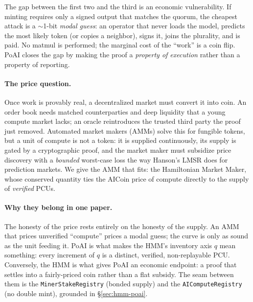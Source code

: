 \documentclass[11pt]{article}
\newcommand{\code}[1]{\texttt{#1}}
\begin{document}
The gap between the first two and the third is an economic vulnerability. If
minting requires only a signed output that matches the quorum, the cheapest attack
is a $\sim$1-bit \emph{modal guess}: an operator that never loads the model,
predicts the most likely token (or copies a neighbor), signs it, joins the
plurality, and is paid. No matmul is performed; the marginal cost of the ``work''
is a coin flip. PoAI closes the gap by making the proof a \emph{property of
execution} rather than a property of reporting.

\paragraph{The price question.} Once work is provably real, a decentralized market
must convert it into coin. An order book needs matched counterparties and deep
liquidity that a young compute market lacks; an oracle reintroduces the trusted
third party the proof just removed. Automated market makers (AMMs) solve this for
fungible tokens, but a unit of compute is not a token: it is supplied
continuously, its supply is gated by a cryptographic proof, and the market maker
must subsidize price discovery with a \emph{bounded} worst-case loss the way Hanson's
LMSR does for prediction markets. We give the AMM that fits: the Hamiltonian
Market Maker, whose conserved quantity ties the AICoin price of compute directly to
the supply of \emph{verified} PCUs.

\paragraph{Why they belong in one paper.} The honesty of the price rests entirely
on the honesty of the supply. An AMM that prices unverified ``compute'' prices a
modal guess; the curve is only as sound as the unit feeding it. PoAI is what makes
the HMM's inventory axis $q$ mean something: every increment of $q$ is a distinct,
verified, non-replayable PCU. Conversely, the HMM is what gives PoAI an economic
endpoint: a proof that settles into a fairly-priced coin rather than a flat
subsidy. The seam between them is the \code{MinerStakeRegistry} (bonded supply) and
the \code{AIComputeRegistry} (no double mint), grounded in \S\ref{sec:hmm-poai}.
\end{document}
